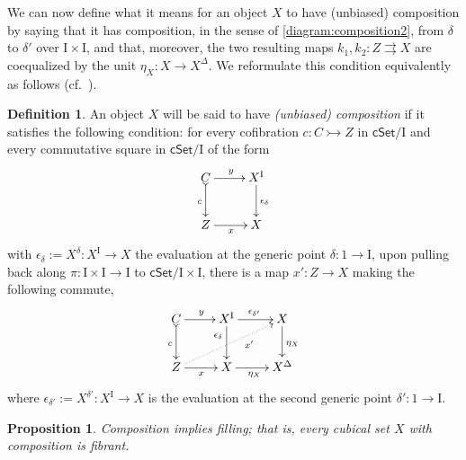 \documentclass[11pt]{article}
\newcommand{\cSet}{\ensuremath{\mathsf{cSet}}}
\newcommand{\mono}{\ensuremath{\rightarrowtail}}
\newcommand{\ra}{\ensuremath{\rightarrow}}
\newcommand{\I}{\ensuremath{\mathrm{I}}}
\newtheorem{proposition}[theorem]{Proposition}
\theoremstyle{remark}
\theoremstyle{definition}
\newtheorem{definition}[theorem]{Definition}
\begin{document}
We can now define what it means for an object $X$ to have (unbiased) composition by saying that it has composition, in the sense of \eqref{diagram:composition2}, from $\delta$ to $\delta'$ over $\I\times \I$, and that, moreover, the two resulting maps $k_1, k_2 : Z\rightrightarrows X$ are coequalized by the unit $\eta_X : X\ra X^\Delta$.  We reformulate this condition equivalently as follows (cf.\ \cite{Coquand,ABCetc.}).

\begin{definition}\label{def:unbiasedcomposition}
An object $X$ will be said to have \emph{(unbiased) composition} if it satisfies the following condition: for every cofibration $c : C \mono Z$ in $\cSet/\I$ and every commutative square in $\cSet/\I$ of the form
\begin{equation*}\label{diagram:compdef1}
\xymatrix{
C \ar@{>->}[d]_{c} \ar[r]^y  & X^\I \ar[d]^{\epsilon_\delta} \\
Z \ar[r]_x & X
}
\end{equation*}
with $\epsilon_\delta := X^\delta : X^\I \to X$ the evaluation at the generic point $\delta : 1 \ra \I$, upon pulling back along $\pi : \I\times\I \ra \I$ to $\cSet/\I\times\I$, there is a map $x' : Z \ra X$ making the following commute, 
\begin{equation}\label{diagram:compdef2}
\xymatrix{
C \ar@{>->}[d]_{c} \ar[r]^y  & X^\I \ar[d]_>>>>>>>{\epsilon_\delta} \ar[r]^{\epsilon_{\delta'}} &  X \ar[d]^{\eta_X}\\
Z  \ar@{..>}[rru]_>>>>>>>>>{x'} \ar[r]_x & X \ar[r]_{\eta_X} & X^\Delta 
}
\end{equation}
where $\epsilon_{\delta'} := X^{\delta'} : X^\I \to X$ is the evaluation at the second generic point $\delta' : 1 \ra \I$.

\end{definition}

\begin{proposition}\label{prop:comptofill}
Composition implies filling; that is, every cubical set $X$ with composition is fibrant.
\end{proposition}
\end{document}
